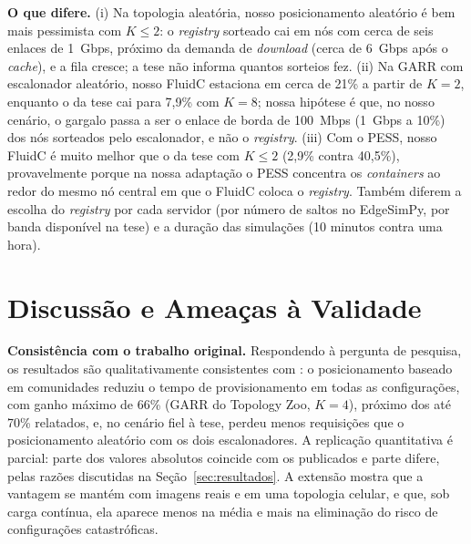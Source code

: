 \documentclass[12pt]{article}
\begin{document}
\textbf{O que difere.} (i) Na topologia aleatória, nosso posicionamento
aleatório é bem mais pessimista com $K \leq 2$: o \textit{registry} sorteado cai
em nós com cerca de seis enlaces de 1~Gbps, próximo da demanda de
\textit{download} (cerca de 6~Gbps após o \textit{cache}), e a fila cresce; a
tese não informa quantos sorteios fez. (ii) Na GARR com escalonador aleatório,
nosso FluidC estaciona em cerca de 21\% a partir de $K = 2$, enquanto o da tese
cai para 7,9\% com $K = 8$; nossa hipótese é que, no nosso cenário, o gargalo
passa a ser o enlace de borda de 100~Mbps (1~Gbps a 10\%) dos nós sorteados pelo
escalonador, e não o \textit{registry}. (iii) Com o PESS, nosso FluidC é muito
melhor que o da tese com $K \leq 2$ (2,9\% contra 40,5\%), provavelmente porque
na nossa adaptação o PESS concentra os \textit{containers} ao redor do mesmo nó
central em que o FluidC coloca o \textit{registry}. Também diferem a escolha do \textit{registry} por
cada servidor (por número de saltos no EdgeSimPy, por banda disponível na tese) e
a duração das simulações (10 minutos contra uma hora).

\section{Discussão e Ameaças à Validade}
\label{sec:discussao}

\textbf{Consistência com o trabalho original.} Respondendo à pergunta de pesquisa,
os resultados são qualitativamente consistentes com \cite{knob2021}: o
posicionamento baseado em comunidades reduziu o tempo de provisionamento em todas
as configurações, com ganho máximo de 66\% (GARR do Topology Zoo, $K = 4$),
próximo dos até 70\% relatados, e, no cenário fiel à tese, perdeu menos
requisições que o posicionamento aleatório com os dois escalonadores. A
replicação quantitativa é parcial: parte dos valores absolutos coincide com os
publicados e parte difere, pelas razões discutidas na
Seção~\ref{sec:resultados}. A extensão mostra que a vantagem se mantém com imagens
reais e em uma topologia celular, e que, sob carga contínua, ela aparece menos na
média e mais na eliminação do risco de configurações catastróficas.
\end{document}
